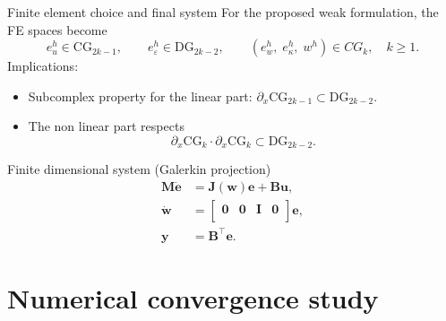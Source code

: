 \documentclass[aspectratio=169]{beamer}
\begin{document}
\begin{frame}{Finite element choice and final system}
	For the proposed weak formulation, the FE spaces become
	\begin{equation*}
			e_u^h \in \mathrm{CG}_{2k-1}, \qquad
			e_{\varepsilon}^h \in \mathrm{DG}_{2k-2}, \qquad 
			(e_w^h, \; e_\kappa^h, \; w^h) \in CG_{k}, \quad k\ge 1.
	\end{equation*}
Implications:
\begin{itemize}
	\item Subcomplex property for the linear part: $\partial_x \mathrm{CG}_{2k-1} \subset \mathrm{DG}_{2k-2}$.
	\item The non linear part respects
	$$\partial_x \mathrm{CG}_k \cdot  \partial_x \mathrm{CG}_k \subset \mathrm{DG}_{2k-2}.$$
\end{itemize}

\begin{block}{Finite dimensional system (Galerkin projection)}
		\begin{equation*}
		\begin{aligned}
			\mathbf{M} \dot{\mathbf{e}} &= \mathbf{J}(\mathbf{w})\mathbf{e} + \mathbf{B}\mathbf{u}, \\
			\dot{\mathbf{w}} &= \begin{bmatrix}
				\mathbf{0} & \mathbf{0} & \mathbf{I} & \mathbf{0} \\
			\end{bmatrix} \mathbf{e}, \\
			\mathbf{y} &= \mathbf{B}^\top \mathbf{e}.
		\end{aligned}
	\end{equation*}
\end{block}

\end{frame}


\section{Numerical convergence study}
\end{document}
